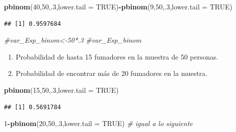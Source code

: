 \documentclass[
]{article}
\newenvironment{Shaded}{\begin{snugshade}}{\end{snugshade}}
\newcommand{\AttributeTok}[1]{\textcolor[rgb]{0.13,0.29,0.53}{#1}}
\newcommand{\CommentTok}[1]{\textcolor[rgb]{0.56,0.35,0.01}{\textit{#1}}}
\newcommand{\ConstantTok}[1]{\textcolor[rgb]{0.56,0.35,0.01}{#1}}
\newcommand{\DecValTok}[1]{\textcolor[rgb]{0.00,0.00,0.81}{#1}}
\newcommand{\FunctionTok}[1]{\textcolor[rgb]{0.13,0.29,0.53}{\textbf{#1}}}
\newcommand{\NormalTok}[1]{#1}
\newcommand{\SpecialCharTok}[1]{\textcolor[rgb]{0.81,0.36,0.00}{\textbf{#1}}}
\providecommand{\tightlist}{%
  \setlength{\itemsep}{0pt}\setlength{\parskip}{0pt}}
\begin{document}
\begin{Shaded}
\begin{Highlighting}[]
\FunctionTok{pbinom}\NormalTok{(}\DecValTok{40}\NormalTok{,}\DecValTok{50}\NormalTok{,.}\DecValTok{3}\NormalTok{,}\AttributeTok{lower.tail =} \ConstantTok{TRUE}\NormalTok{)}\SpecialCharTok{{-}}\FunctionTok{pbinom}\NormalTok{(}\DecValTok{9}\NormalTok{,}\DecValTok{50}\NormalTok{,.}\DecValTok{3}\NormalTok{,}\AttributeTok{lower.tail =} \ConstantTok{TRUE}\NormalTok{)}
\end{Highlighting}
\end{Shaded}

\begin{verbatim}
## [1] 0.9597684
\end{verbatim}

\begin{Shaded}
\begin{Highlighting}[]
\CommentTok{\#var\_Esp\_binom\textless{}{-}50*.3}
\CommentTok{\#var\_Esp\_binom}
\end{Highlighting}
\end{Shaded}

\begin{enumerate}
\def\labelenumi{\arabic{enumi})}
\tightlist
\item
  Probabilidad de hasta 15 fumadores en la muestra de 50 personas.\\
\item
  Probabilidad de encontrar más de 20 fumadores en la muestra.
\end{enumerate}

\begin{Shaded}
\begin{Highlighting}[]
\FunctionTok{pbinom}\NormalTok{(}\DecValTok{15}\NormalTok{,}\DecValTok{50}\NormalTok{,.}\DecValTok{3}\NormalTok{,}\AttributeTok{lower.tail =} \ConstantTok{TRUE}\NormalTok{)}
\end{Highlighting}
\end{Shaded}

\begin{verbatim}
## [1] 0.5691784
\end{verbatim}

\begin{Shaded}
\begin{Highlighting}[]
\DecValTok{1}\SpecialCharTok{{-}}\FunctionTok{pbinom}\NormalTok{(}\DecValTok{20}\NormalTok{,}\DecValTok{50}\NormalTok{,.}\DecValTok{3}\NormalTok{,}\AttributeTok{lower.tail =} \ConstantTok{TRUE}\NormalTok{) }\CommentTok{\# igual a lo siguiente}
\end{Highlighting}
\end{Shaded}
\end{document}
